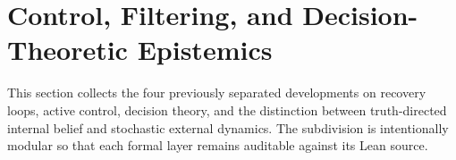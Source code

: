 \section{Control, Filtering, and Decision-Theoretic Epistemics}

This section collects the four previously separated developments on recovery loops, active control, decision theory, and the distinction between truth-directed internal belief and stochastic external dynamics. The subdivision is intentionally modular so that each formal layer remains auditable against its Lean source.





